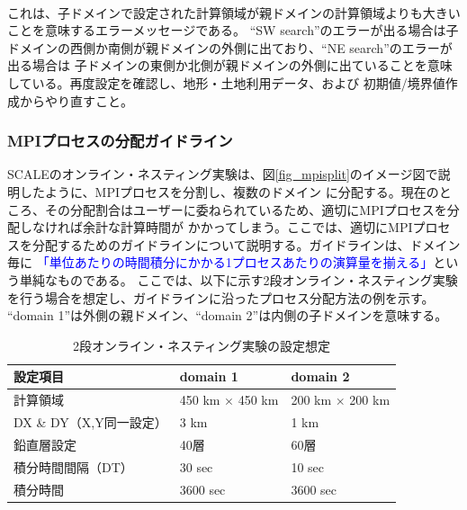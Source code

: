 \\

\noindent これは、子ドメインで設定された計算領域が親ドメインの計算領域よりも大きいことを意味するエラーメッセージである。
``SW search''のエラーが出る場合は子ドメインの西側か南側が親ドメインの外側に出ており、``NE search''のエラーが出る場合は
子ドメインの東側か北側が親ドメインの外側に出ていることを意味している。再度設定を確認し、地形・土地利用データ、および
初期値/境界値作成からやり直すこと。


\subsubsection{MPIプロセスの分配ガイドライン}
SCALEのオンライン・ネスティング実験は、図\ref{fig_mpisplit}のイメージ図で説明したように、MPIプロセスを分割し、複数のドメイン
に分配する。現在のところ、その分配割合はユーザーに委ねられているため、適切にMPIプロセスを分配しなければ余計な計算時間が
かかってしまう。ここでは、適切にMPIプロセスを分配するためのガイドラインについて説明する。ガイドラインは、ドメイン毎に
\textcolor{blue}{「単位あたりの時間積分にかかる1プロセスあたりの演算量を揃える」}という単純なものである。
ここでは、以下に示す2段オンライン・ネスティング実験を行う場合を想定し、ガイドラインに沿ったプロセス分配方法の例を示す。
``domain 1''は外側の親ドメイン、``domain 2''は内側の子ドメインを意味する。

\begin{table}[htb]
\begin{center}
\caption{2段オンライン・ネスティング実験の設定想定}
\begin{tabularx}{150mm}{|l|l|X|} \hline
 \rowcolor[gray]{0.9} 設定項目 & domain 1 & domain 2 \\ \hline
 計算領域 & 450 km $\times$ 450 km & 200 km $\times$ 200 km \\ \hline
 DX \& DY（X,Y同一設定） & 3 km & 1 km \\ \hline
 鉛直層設定 & 40層 & 60層 \\ \hline
 積分時間間隔（DT）& 30 sec & 10 sec \\ \hline
 積分時間 & 3600 sec & 3600 sec \\ \hline
\end{tabularx}
\label{tab:nest_proc_guide1}
\end{center}
\end{table}

